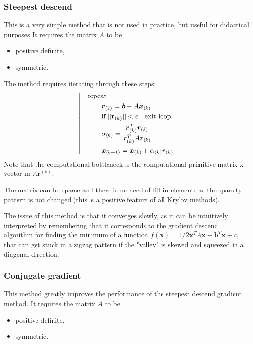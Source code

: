 \documentclass{digitaldynamics}
\def\vect#1{\bm{#1}}
\def\matr#1{{#1}}
\begin{document}
\subsubsection{Steepest descend}

This is a very simple method that is not used in practice, but useful for didactical purposes It requires the matrix $\matr{A}$ to be 
\begin{itemize}
\item positive definite,
\item symmetric.
\end{itemize}
The method requires iterating through these steps:
\begin{align}
	\left| \quad
	\begin{aligned}
			& \text{repeat} \\
		  & \qquad \vect{r}_{(k)} = \vect{b} - \matr{A}\vect{x}_{(k)} \\
			& \qquad \hbox{if } ||\mathbf{r}_{(k)}|| < \epsilon \quad \text{exit loop} \\
			& \qquad \alpha_{(k)} = \frac{\vect{r}_{(k)}^T\vect{r}_{(k)}}{\vect{r}_{(k)}^T \matr{A} \vect{r}_{(k)}} \\
			& \qquad \vect{x}_{(k+1)} = \vect{x}_{(k)} + \alpha_{(k)} \vect{r}_{(k)}
	\end{aligned}
	\right.
	\label{eq:stokes}
\end{align}
Note that the computational bottleneck is the computational primitive matrix x vector in $\matr{A} \vect{r}^{(k)}$. 

The matrix can be sparse and there is no need of fill-in elements as the sparsity pattern is not changed (this is a positive feature of all Krylov methods).

The issue of this method is that it converges slowly, as it can be intuitively interpreted by remembering that it corresponds to the gradient descend algorithm for finding the minimum of a function $f(\vect{x})= 1/2 \vect{x}^T\matr{A}\vect{x} - \vect{b}^T \vect{x} + c$, that can get stuck in a zigzag pattern if the "valley" is skewed and squeezed in a diagonal direction.

 
\subsubsection{Conjugate gradient}

This method greatly improves the performance of the steepest descend gradient method. It requires the matrix $\matr{A}$ to be 
\begin{itemize}
\item positive definite,
\item symmetric.
\end{itemize}
\end{document}
